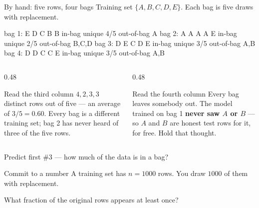 \documentclass[aspectratio=169]{beamer}
\begin{document}
\begin{frame}[fragile]{By hand: five rows, four bags}
  Training set $\{A, B, C, D, E\}$. Each bag is five draws with replacement.
\begin{outblk}
bag 1: E D C B B   in-bag unique 4/5   out-of-bag A
bag 2: A A A A E   in-bag unique 2/5   out-of-bag B,C,D
bag 3: D E C D E   in-bag unique 3/5   out-of-bag A,B
bag 4: D D C C E   in-bag unique 3/5   out-of-bag A,B
\end{outblk}
  \begin{columns}[T]
    \begin{column}{0.48\textwidth}
      \begin{block}{Read the third column}
        $4, 2, 3, 3$ distinct rows out of five --- an average of
        $3/5 = 0.60$. Every bag is a different training set; bag 2 has
        never heard of three of the five rows.
      \end{block}
    \end{column}
    \begin{column}{0.48\textwidth}
      \begin{alertblock}{Read the fourth column}
        Every bag leaves somebody out. The model trained on bag 1
        \textbf{never saw $A$ or $B$} --- so $A$ and $B$ are honest test rows
        for it, for free. Hold that thought.
      \end{alertblock}
    \end{column}
  \end{columns}
\end{frame}

\begin{frame}{Predict first \#3 --- how much of the data is in a bag?}
  \begin{alertblock}{Commit to a number}
    A training set has $n = 1000$ rows. You draw $1000$ of them with
    replacement.

    \medskip
    \centering\large
    What fraction of the original rows appears at least once?
  \end{alertblock}
\end{frame}
\end{document}
